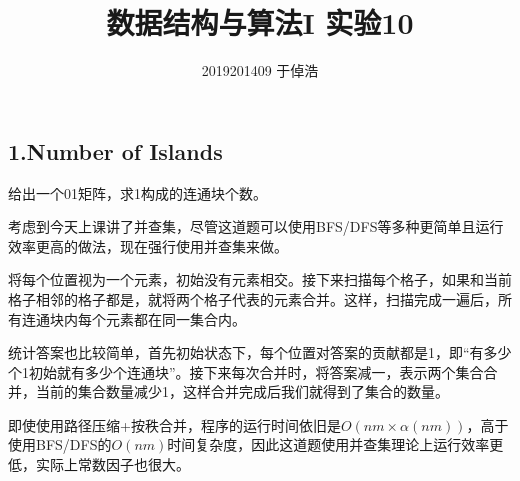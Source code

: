 \documentclass[]{article}
\title{数据结构与算法I 实验10}
\author{2019201409 于倬浩}
\begin{document}
\maketitle

\hypertarget{header-n25}{%
\subsection{1.Number of Islands}\label{header-n25}}

给出一个01矩阵，求1构成的连通块个数。

考虑到今天上课讲了并查集，尽管这道题可以使用BFS/DFS等多种更简单且运行效率更高的做法，现在强行使用并查集来做。

将每个位置视为一个元素，初始没有元素相交。接下来扫描每个格子，如果和当前格子相邻的格子都是，就将两个格子代表的元素合并。这样，扫描完成一遍后，所有连通块内每个元素都在同一集合内。

统计答案也比较简单，首先初始状态下，每个位置对答案的贡献都是1，即``有多少个1初始就有多少个连通块''。接下来每次合并时，将答案减一，表示两个集合合并，当前的集合数量减少1，这样合并完成后我们就得到了集合的数量。

即使使用路径压缩+按秩合并，程序的运行时间依旧是\(O(nm \times \alpha(nm))\)，高于使用BFS/DFS的\(O(nm)\)时间复杂度，因此这道题使用并查集理论上运行效率更低，实际上常数因子也很大。
\end{document}
